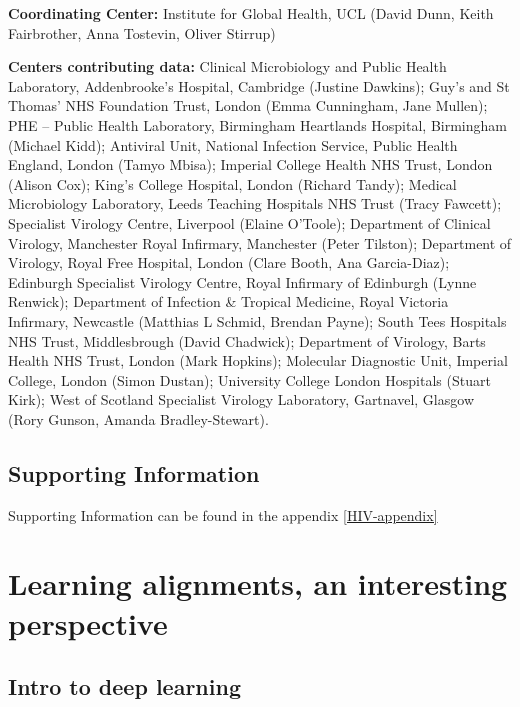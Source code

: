 \documentclass[
  11pt,
  twoside,
  BCOR=10mm,
  listof=totoc]{scrbook}
\begin{document}
\textbf{Coordinating Center:}
Institute for Global Health, UCL (David Dunn, Keith Fairbrother,
Anna Tostevin, Oliver Stirrup)

\textbf{Centers contributing data:}
Clinical Microbiology and Public Health Laboratory, Addenbrooke's
Hospital, Cambridge (Justine Dawkins); Guy's and St Thomas' NHS
Foundation Trust, London (Emma Cunningham, Jane Mullen); PHE --
Public Health Laboratory, Birmingham Heartlands Hospital, Birmingham
(Michael Kidd); Antiviral Unit, National Infection Service, Public
Health England, London (Tamyo Mbisa); Imperial College Health NHS
Trust, London (Alison Cox); King's College Hospital, London (Richard
Tandy); Medical Microbiology Laboratory, Leeds Teaching Hospitals
NHS Trust (Tracy Fawcett); Specialist Virology Centre, Liverpool
(Elaine O'Toole); Department of Clinical Virology, Manchester Royal
Infirmary, Manchester (Peter Tilston); Department of Virology, Royal
Free Hospital, London (Clare Booth, Ana Garcia-Diaz); Edinburgh
Specialist Virology Centre, Royal Infirmary of Edinburgh (Lynne
Renwick); Department of Infection \& Tropical Medicine, Royal
Victoria Infirmary, Newcastle (Matthias L Schmid, Brendan Payne);
South Tees Hospitals NHS Trust, Middlesbrough (David Chadwick);
Department of Virology, Barts Health NHS Trust, London (Mark
Hopkins); Molecular Diagnostic Unit, Imperial College, London (Simon
Dustan); University College London Hospitals (Stuart Kirk); West of
Scotland Specialist Virology Laboratory, Gartnavel, Glasgow (Rory
Gunson, Amanda Bradley-Stewart).

\hypertarget{supporting-information}{%
\section*{Supporting Information}\label{supporting-information}}

Supporting Information can be found in the appendix \ref{HIV-appendix}

\printbibliography[segment=\therefsegment,heading=subbibintoc,title={References for chapter \thechapter}]

\hypertarget{learning-alignments-an-interesting-perspective}{%
\chapter{Learning alignments, an interesting perspective}\label{learning-alignments-an-interesting-perspective}}

\hypertarget{intro-to-deep-learning}{%
\section{Intro to deep learning}\label{intro-to-deep-learning}}
\end{document}
